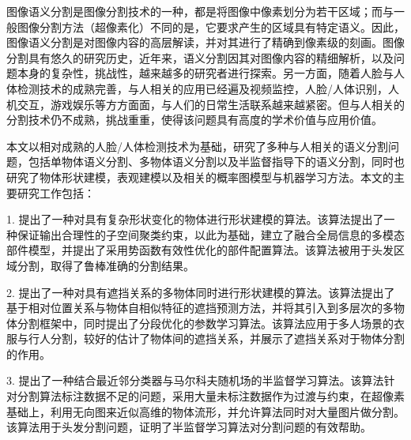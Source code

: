 \begin{cabstract}
图像语义分割是图像分割技术的一种，都是将图像中像素划分为若干区域；而与一般图像分割方法（超像素化）不同的是，它要求产生的区域具有特定语义。因此，图像语义分割是对图像内容的高层解读，并对其进行了精确到像素级的刻画。图像分割具有悠久的研究历史，近年来，语义分割因其对图像内容的精细解析，以及问题本身的复杂性，挑战性，越来越多的研究者进行探索。另一方面，随着人脸与人体检测技术的成熟完善，与人相关的应用已经遍及视频监控，人脸/人体识别，人机交互，游戏娱乐等方方面面，与人们的日常生活联系越来越紧密。但与人相关的分割技术仍不成熟，挑战重重，使得该问题具有高度的学术价值与应用价值。

本文以相对成熟的人脸/人体检测技术为基础，研究了多种与人相关的语义分割问题，包括单物体语义分割、多物体语义分割以及半监督指导下的语义分割，同时也研究了物体形状建模，表观建模以及相关的概率图模型与机器学习方法。本文的主要研究工作包括：

1. 提出了一种对具有复杂形状变化的物体进行形状建模的算法。该算法提出了一种保证输出合理性的子空间聚类约束，以此为基础，建立了融合全局信息的多模态部件模型，并提出了采用势函数有效性优化的部件配置算法。该算法被用于头发区域分割，取得了鲁棒准确的分割结果。

2. 提出了一种对具有遮挡关系的多物体同时进行形状建模的算法。该算法提出了基于相对位置关系与物体自相似特征的遮挡预测方法，并将其引入到多层次的多物体分割框架中，同时提出了分段优化的参数学习算法。该算法应用于多人场景的衣服与行人分割，较好的估计了物体间的遮挡关系，并展示了遮挡关系对于物体分割的作用。

3. 提出了一种结合最近邻分类器与马尔科夫随机场的半监督学习算法。该算法针对分割算法标注数据不足的问题，采用大量未标注数据作为过渡与约束，在超像素基础上，利用无向图来近似高维的物体流形，并允许算法同时对大量图片做分割。该算法用于头发分割问题，证明了半监督学习算法对分割问题的有效帮助。

\end{cabstract}


